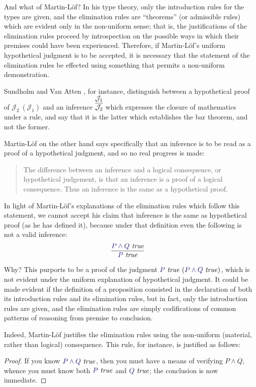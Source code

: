 \documentclass[11pt]{amsart}
\theoremstyle{definition}
\theoremstyle{remark}
\numberwithin{equation}{section}
\def\InputModeColorName{MidnightBlue}
\newcommand\InputMode[1]{{\color{\InputModeColorName}{#1}}}
\newcommand\HypJ[2]{#1\ (#2)}
\newcommand\JJ{\mathcal{J}}
\newcommand\IsTrue[1]{\InputMode{#1}\ \mathit{true}}
\begin{document}
And what of Martin-L\"of? In his type theory, only the introduction rules for
the types are given, and the elimination rules are ``theorems'' (or admissible
rules) which are evident only in the non-uniform sense; that is, the
justifications of the elimination rules proceed by introspection on the possible
ways in which their premises could have been experienced. Therefore, if
Martin-L\"of's uniform hypothetical judgment is to be accepted, it is necessary
that the statement of the elimination rules be effected using something that
permits a non-uniform demonstration.

Sundholm and Van Atten \cite{sundholm-mva}, for instance, distinguish between a
hypothetical proof of $\HypJ{\JJ_2}{\JJ_1}$ and an inference
$\infer{\JJ_2}{\JJ_1}$ which expresses the closure of mathematics under a rule,
and say that it is the latter which establishes the bar theorem, and not
the former.

Martin-L\"of on the other hand says specifically that an inference is to be read
as a proof of a hypothetical judgment, and so no real progress is made:
\begin{quote}
  The difference between an inference and a logical consequence, or hypothetical
  judgement, is that an inference is a proof of a logical consequence. Thus an
  inference is the same as a hypothetical proof. \cite{siena.lectures}
\end{quote}

In light of Martin-L\"of's explanations of the elimination rules which follow
this statement, we cannot accept his claim that inference is the same as
hypothetical proof (as he has defined it), because under that definition even
the following is not a valid inference:
\[
  \infer{
    \IsTrue{P}
  }{
    \IsTrue{P\land Q}
  }
\]

Why? This purports to be a proof of the judgment
$\HypJ{\IsTrue{P}}{\IsTrue{P\land Q}}$, which is not evident under the uniform
explanation of hypothetical judgment. It could be made evident if the definition
of a proposition consisted in the declaration of both its introduction rules and
its elimination rules, but in fact, only the introduction rules are given, and
the elimination rules are simply codifications of common patterns of reasoning
from premise to conclusion.

Indeed, Martin-L\"of justifies the elimination rules using the non-uniform
(material, rather than logical) consequence. This rule, for instance, is
justified as follows:

\begin{proof}
If you know $\IsTrue{P\land Q}$, then you must have a means of verifying $P\land
Q$, whence you must know both $\IsTrue{P}$ and $\IsTrue{Q}$; the conclusion is
now immediate.
\end{proof}
\end{document}

